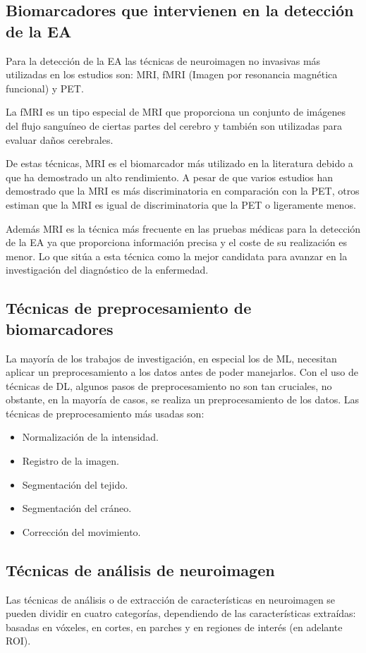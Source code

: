 \subsection{Biomarcadores que intervienen en la detección de la EA}\label{subsec:biomarcadores-estado-del-arte}
Para la detección de la EA las técnicas de neuroimagen no invasivas más utilizadas en los estudios son: MRI, fMRI
(Imagen por resonancia magnética funcional)  y PET.

La fMRI es un tipo especial de MRI que proporciona un conjunto de imágenes del flujo sanguíneo de ciertas partes del
cerebro y también son utilizadas para evaluar daños cerebrales.

De estas técnicas, MRI es el biomarcador más utilizado en la literatura debido a que ha demostrado un alto rendimiento.
A pesar de que varios estudios han demostrado que la MRI es más discriminatoria en comparación con la PET, otros estiman
que la MRI es igual de discriminatoria que la PET o ligeramente menos.

Además MRI es la técnica más frecuente en las pruebas médicas para la detección de la EA ya que proporciona información
precisa y el coste de su realización es menor.
Lo que sitúa a esta técnica como la mejor candidata para avanzar en la investigación del diagnóstico de la enfermedad.

\subsection{Técnicas de preprocesamiento de biomarcadores}\label{subsec:preprocesamiento-estado-del-arte}
La mayoría de los trabajos de investigación, en especial los de ML, necesitan aplicar un preprocesamiento a los datos
antes de poder manejarlos.
Con el uso de técnicas de DL, algunos pasos de preprocesamiento no son tan cruciales, no obstante, en la mayoría de
casos, se realiza un preprocesamiento de los datos.
Las técnicas de preprocesamiento más usadas son:
\begin{itemize}
    \item Normalización de la intensidad.
    \item Registro de la imagen.
    \item Segmentación del tejido.
    \item Segmentación del cráneo.
    \item Corrección del movimiento.\\
\end{itemize}

\subsection{Técnicas de análisis de neuroimagen}\label{subsec:analisis-de neuroimagen-estado-del-arte}
Las técnicas de análisis o de extracción de características en neuroimagen se pueden dividir en cuatro categorías,
dependiendo de las características extraídas: basadas en vóxeles, en cortes, en parches y en regiones de interés
(en adelante ROI).


